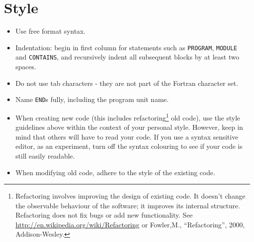 \section{Style}
\begin{itemize}
  \item Use free format syntax.
  \item Indentation: begin in first column for statements such as \texttt{PROGRAM}, \texttt{MODULE} and \texttt{CONTAINS}, and recursively indent all subsequent blocks by at least two spaces.
  \item Do not use tab characters - they are not part of the Fortran character set.
  \item Name \texttt{END}s fully, including the program unit name.
  \item When creating new code (this includes refactoring\footnote{Refactoring involves improving the design of existing code. It doesn't change the observable behaviour of the software; it improves its internal structure. Refactoring does not fix bugs or add new functionality. See \href{http://en.wikipedia.org/wiki/Refactoring}{http://en.wikipedia.org/wiki/Refactoring} or Fowler,M., ``Refactoring'', 2000, Addison-Wesley.} old code), use the style guidelines above within the context of your personal style. However, keep in mind that others will have to read your code. If you use a syntax sensitive editor, as an experiment, turn off the syntax colouring to see if your code is still easily readable.
  \item When modifying old code, adhere to the style of the existing code.
\end{itemize}


